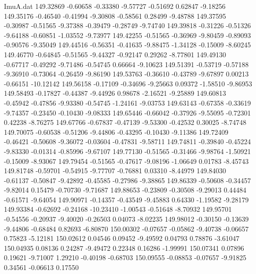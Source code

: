 \begin{filecontents}{ImuA.dat}
 149.32869   -0.60658   -0.33380   -9.57727   -0.51692    0.62847   -9.18256
 149.35176   -0.46540   -0.41994   -9.30808   -0.58561    0.28499   -9.48788
 149.37595   -0.30987   -0.51565   -9.37388   -0.39479   -0.28749   -9.74740
 149.39818   -0.31226   -0.51326   -9.64188   -0.60851   -1.03552   -9.73977
 149.42255   -0.51565   -0.36969   -9.80459   -0.89093   -0.90576   -9.35049
 149.44516   -0.56351   -0.41635   -9.88475   -1.34128   -0.15009   -8.60245
 149.46770   -0.64845   -0.51565   -9.44327   -0.92147    0.29262   -8.77801
 149.49130   -0.67717   -0.49292   -9.71486   -0.54745    0.66664   -9.10623
 149.51391   -0.53719   -0.57188   -9.36910   -0.73064   -0.26459   -9.86190
 149.53763   -0.36610   -0.43789   -9.67897    0.00213   -0.66151  -10.12142
 149.56158   -0.17109   -0.34696   -9.25663    0.09372   -1.58510   -9.86953
 149.58493   -0.17827   -0.44387   -9.44926    0.98678   -2.16521   -9.25889
 149.60813   -0.45942   -0.47856   -9.93380   -0.54745   -1.24161   -9.03753
 149.63143   -0.67358   -0.33619   -9.74357   -0.23450   -0.10430   -9.08333
 149.65446   -0.66042   -0.37926   -9.55095   -0.72301    0.42238   -8.76275
 149.67766   -0.67837   -0.47139   -9.53300   -0.42532    0.30025   -8.74748
 149.70075   -0.60538   -0.51206   -9.44806   -0.43295   -0.10430   -9.11386
 149.72409   -0.46421   -0.50608   -9.36072   -0.03604   -0.47831   -9.58711
 149.74811   -0.39840   -0.45224   -9.83330   -0.01314   -0.85996   -9.67107
 149.77130   -0.51565   -0.31466   -9.98764   -1.50921   -0.15009   -8.93067
 149.79454   -0.51565   -0.47617   -9.08196   -1.06649    0.01783   -8.45743
 149.81748   -0.59701   -0.54915   -9.77707   -0.76881    0.03310   -8.44979
 149.84030   -0.61137   -0.50847   -9.42892   -0.45585   -0.27986   -9.38865
 149.86339   -0.50608   -0.34457   -9.82014    0.15479   -0.70730   -9.71687
 149.88653   -0.23809   -0.30508   -9.29013    0.44484   -0.61571   -9.64054
 149.90971   -0.14357   -0.43549   -9.45883    0.64330   -1.19582   -9.28179
 149.93384   -0.62692   -0.24168  -10.23410   -1.00543   -0.51648   -8.70932
 149.95701   -0.54556   -0.20937   -9.40020   -0.26503    0.04073   -8.02235
 149.98012   -0.30150   -0.13639   -9.44806   -0.68484    0.82693   -6.80870
 150.00302   -0.07657   -0.05862   -9.40738   -0.06657    0.75823   -5.12181
 150.02612    0.04546    0.09452   -9.49592    0.04793    0.78876   -3.61047
 150.04935    0.08136    0.24287   -9.49472    0.22348    0.16286   -1.99991
 150.07341    0.07896    0.19621   -9.71007    1.29210   -0.40198   -0.68703
 150.09555   -0.08853   -0.07657   -9.91825    0.34561   -0.06613    0.17550

\end{filecontents}
